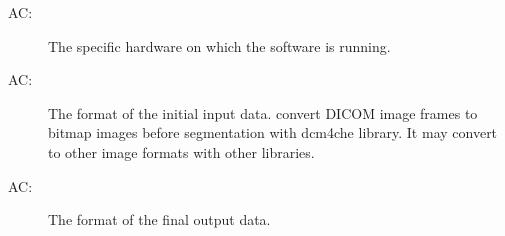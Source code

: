 \documentclass[12pt, titlepage]{article}
\newcounter{acnum}
\newcommand{\actheacnum}{AC\theacnum}
\begin{document}
\begin{description}
\item[ \actheacnum \label{acHardware}:] The specific
hardware on which the software is running.

\item[ \actheacnum \label{acInput}:] The format of the
initial   input data. \progname{}
convert DICOM image frames to bitmap images before segmentation with dcm4che
library. It may convert to other image formats with other libraries.

\item[ \actheacnum \label{acOutput}:] The format of the
final  output data.


\end{description}
\end{document}
